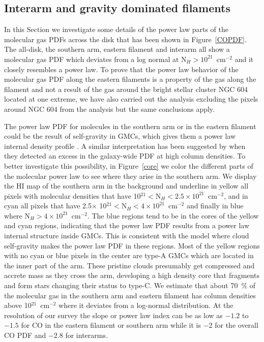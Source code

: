 \documentclass{aa}
\begin{document}
\subsection{Interarm and gravity dominated filaments}

In this Section we  investigate some details of the power law parts of the   molecular gas  PDFs across the
disk  that has been shown in Figure~\ref{COPDF}. 
The all-disk, the southern arm, eastern filament and interarm all show
a molecular gas PDF which deviates from a log normal at N$_H>10^{21}$~cm$^{-2}$ and it closely
resembles a power law.
To prove that the power law behavior of  the molecular gas PDF along the eastern filaments is
a property  of the gas along the filament and not a result of the gas around the bright stellar 
cluster NGC 604 located at one extreme,  we have also carried out the analysis 
excluding the pixels around NGC 604 from the analysis  but the same conclusions apply.
 
The power law PDF for molecules in the southern arm or in the eastern filament 
could be the result of self-gravity in GMCs,
which gives them a power law internal density profile
\citep{klessen00,vaz08,kritsuk11,2014ApJ...781...91G}.   A similar interpretation has been 
suggested by \citet{druard14} when they detected an excess in the galaxy-wide PDF at high column 
densities. To better investigate this possibility, 
in Figure~\ref{core} we color the different parts of the molecular
power law to see where they arise in the southern arm. We display the HI map of the
southern arm in the background and underline in yellow all pixels with molecular
densities that have 10$^{21}<$N$_H<2.5\times 10^{21}$~cm$^{-2}$, and in cyan all
pixels that have 2.5$\times$ 10$^{21}<$N$_H<4\times 10^{21}$~cm$^{-2}$ and finally
in blue where  N$_H>4\times 10^{21}$~cm$^{-2}$. 
The blue regions tend to be in the cores of the yellow and cyan regions, indicating that 
the power law PDF results from a power law internal structure inside GMCs. 
This is consistent with the model where cloud self-gravity makes the power law PDF in these regions.
Most of the yellow
regions with no cyan or blue pixels in the center are type-A GMCs which are
located in the inner part of the arm. These pristine clouds  presumably get
compressed and accrete mass as they cross the arm, developing a high density core
that fragments and form stars changing their status to type-C. We estimate that about 70~$\%$ of the
molecular gas in the southern arm and  eastern filament has column densities
above 10$^{21}$~cm$^{-2}$  where it deviates from a log-normal distribution.
At the resolution of our survey the slope or power law index can be as low as
$-1.2$ to $-1.5$ for CO in the eastern filament or southern arm while it is $-2$
for the overall CO PDF and $-2.8$ for interarms.
\end{document}
